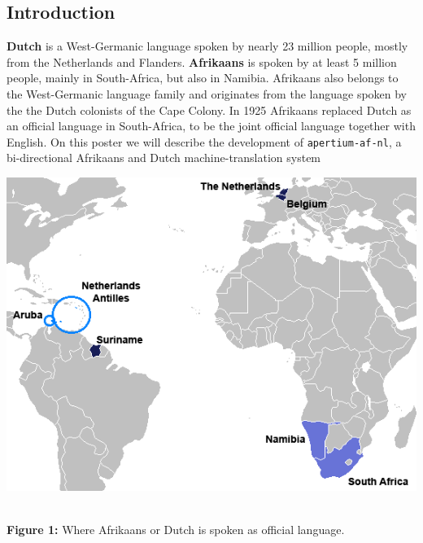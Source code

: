 \documentclass[a0,landscape]{a0poster}
\begin{document}
\begin{multicols}{4}

\newlength{\figwidth}
\setlength{\figwidth}{20cm}

\newlength{\fighalfwidth}
\setlength{\fighalfwidth}{10cm}


\section{Introduction}

\noindent
{\bf Dutch} is a West-Germanic language spoken by nearly 23 million people, mostly from the 
Netherlands and Flanders. {\bf Afrikaans} is spoken by at least 5 million people, mainly in 
South-Africa, but also in Namibia. Afrikaans also belongs to the West-Germanic language family and originates from the language 
spoken by the the Dutch colonists of the Cape Colony. In 1925 Afrikaans replaced Dutch as
an official language in South-Africa, to be the joint official language together with English.
On this poster we will describe the development of {\small {\tt apertium-af-nl}}, a bi-directional Afrikaans 
and Dutch machine-translation system

\begin{center}
\begin{minipage}[b]{26cm}
\includegraphics[width=260mm]{mapdutchworld.png}
\end{minipage}\\
\textbf{Figure 1:} Where Afrikaans or Dutch is spoken as official language.
\vspace{0.3cm}
\end{center}


\end{multicols}
\end{document}
